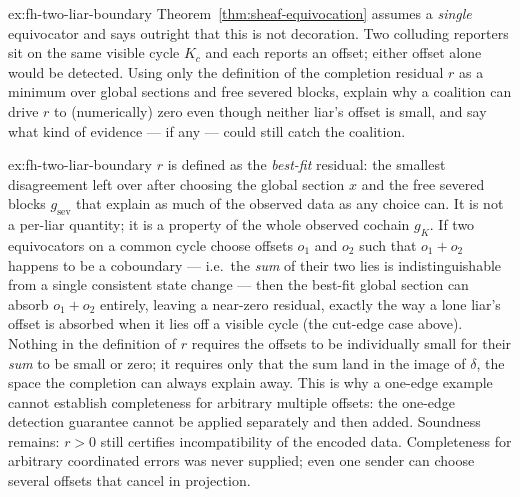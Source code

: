 \documentclass[11pt,a4paper]{article}
\theoremstyle{definition}
\theoremstyle{remark}
\begin{document}
\begin{pdexercise}[kind=Open,rating=3]{ex:fh-two-liar-boundary}
Theorem~\ref{thm:sheaf-equivocation} assumes a \emph{single} equivocator and says outright that this is not decoration. Two colluding reporters sit on the same visible cycle $K_c$ and each reports an offset; either offset alone would be detected. Using only the definition of the completion residual $r$ as a minimum over global sections and free severed blocks, explain why a coalition can drive $r$ to (numerically) zero even though neither liar's offset is small, and say what kind of evidence --- if any --- could still catch the coalition.
\end{pdexercise}
\begin{pdsolution}{ex:fh-two-liar-boundary}
$r$ is defined as the \emph{best-fit} residual: the smallest disagreement left over after choosing the global section $x$ and the free severed blocks $g_{\mathrm{sev}}$ that explain as much of the observed data as any choice can. It is not a per-liar quantity; it is a property of the whole observed cochain $g_K$. If two equivocators on a common cycle choose offsets $o_1$ and $o_2$ such that $o_1+o_2$ happens to be a coboundary --- i.e.\ the \emph{sum} of their two lies is indistinguishable from a single consistent state change --- then the best-fit global section can absorb $o_1+o_2$ entirely, leaving a near-zero residual, exactly the way a lone liar's offset is absorbed when it lies off a visible cycle (the cut-edge case above). Nothing in the definition of $r$ requires the offsets to be individually small for their \emph{sum} to be small or zero; it requires only that the sum land in the image of $\delta$, the space the completion can always explain away. This is why a one-edge example cannot establish completeness for arbitrary multiple offsets: the one-edge detection guarantee cannot be applied separately and then
added. Soundness remains: $r>0$ still certifies incompatibility of the encoded
data. Completeness for arbitrary coordinated errors was never supplied; even
one sender can choose several offsets that cancel in projection.


\end{pdsolution}
\end{document}
